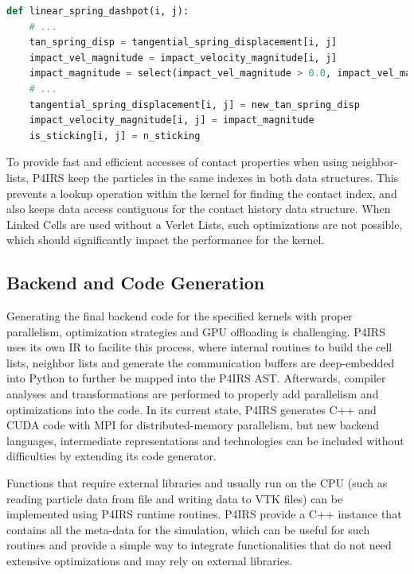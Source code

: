 \documentclass[preprint,12pt]{elsarticle}
\begin{document}
\begin{lstlisting}[language=Python,
		   label={lst:contactprops2},
		   caption={Setup example for contact properties.}]
def linear_spring_dashpot(i, j):
    # ...
    tan_spring_disp = tangential_spring_displacement[i, j]
    impact_vel_magnitude = impact_velocity_magnitude[i, j]
    impact_magnitude = select(impact_vel_magnitude > 0.0, impact_vel_magnitude, length(rel_vel))
    # ...
    tangential_spring_displacement[i, j] = new_tan_spring_disp
    impact_velocity_magnitude[i, j] = impact_magnitude
    is_sticking[i, j] = n_sticking
\end{lstlisting}

To provide fast and efficient accesses of contact properties when using neighbor-lists, P4IRS keep the particles in the same indexes in both data structures.
This prevents a lookup operation within the kernel for finding the contact index, and also keeps data access contiguous for the contact history data structure.
When Linked Cells are used without a Verlet Lists, such optimizations are not possible, which should significantly impact the performance for the kernel.


\subsection{Backend and Code Generation}
\label{sec:backend}

Generating the final backend code for the specified kernels with proper parallelism, optimization strategies and GPU offloading is challenging.
P4IRS uses its own \ac{IR} to facilite this process, where internal routines to build the cell lists, neighbor lists and generate the communication buffers are deep-embedded into Python to further be mapped into the P4IRS \ac{AST}.
Afterwards, compiler analyses and transformations are performed to properly add parallelism and optimizations into the code.
In its current state, P4IRS generates C++ and CUDA code with MPI for distributed-memory parallelism, but new backend languages, intermediate representations and technologies can be included without difficulties by extending its code generator.

Functions that require external libraries and usually run on the CPU (such as reading particle data from file and writing data to VTK files) can be implemented using P4IRS runtime routines.
P4IRS provide a C++ instance that contains all the meta-data for the simulation, which can be useful for such routines and provide a simple way to integrate functionalities that do not need extensive optimizations and may rely on external libraries.
\end{document}
